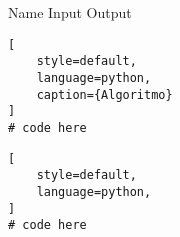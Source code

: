 
\begin{code}{\algtitle
{%
Name
}
{%
Input
}
{%
Output
}}
{ %

}
\begin{lstlisting}[
    style=default,
    language=python,
    caption={Algoritmo}
]
# code here
\end{lstlisting}
\end{code}

\begin{code}{}{}
\begin{lstlisting}[
    style=default,
    language=python,
]
# code here
\end{lstlisting}
\end{code}

